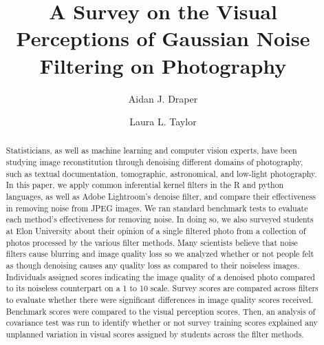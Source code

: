 \documentclass{ncjms}
\begin{document}
\title{A Survey on the Visual Perceptions of Gaussian Noise Filtering on Photography}

  \author[Aidan J. Draper]{Aidan J. Draper}
  \address[Aidan J. Draper]{Department of Math and Statistics, Elon University, Elon, NC 27244, US}

  \author{Laura L. Taylor}
  \address[Laura L. Taylor]{Department of Math and Statistics, Elon University, Elon, NC 27244, US}





\begin{abstract}
Statisticians, as well as machine learning and computer vision experts, have been studying image reconstitution through denoising different domains of photography, such as textual documentation, tomographic, astronomical, and low-light photography. In this paper, we apply common inferential kernel filters in the R and python languages, as well as Adobe Lightroom's denoise filter, and compare their effectiveness in removing noise from JPEG images. We ran standard benchmark tests to evaluate each method's effectiveness for removing noise. In doing so, we also surveyed students at Elon University about their opinion of a single filtered photo from a collection of photos processed by the various filter methods. Many scientists believe that noise filters cause blurring and image quality loss so we analyzed whether or not people felt as though denoising causes any quality loss as compared to their noiseless images. Individuals assigned scores indicating the image quality of a denoised photo compared to its noiseless counterpart on a 1 to 10 scale. Survey scores are compared across filters to evaluate whether there were significant differences in image quality scores received. Benchmark scores were compared to the visual perception scores. Then, an analysis of covariance test was run to identify whether or not survey training scores explained any unplanned variation in visual scores assigned by students across the filter methods.
\end{abstract}
\end{document}

